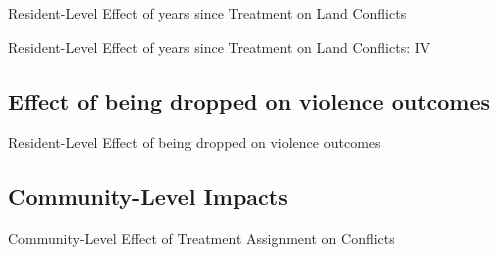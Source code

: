 \documentclass[10pt]{article}
\begin{document}
\begin{landscape}
\begin{table}[H]
\caption{Resident-Level Effect of years since Treatment on Land Conflicts}
\begin{center}
\begin{adjustbox}{max height = .6\textheight}

\end{adjustbox}
\end{center}
\end{table}

\begin{table}[H]
\caption{Resident-Level Effect of years since Treatment on Land Conflicts: IV}
\begin{center}
\begin{adjustbox}{max width = \textwidth}

\end{adjustbox}
\end{center}
\end{table}
\end{landscape}


\subsection{Effect of being dropped on violence outcomes}
\begin{table}[H]
\caption{Resident-Level Effect of being dropped on violence outcomes}
\begin{center}
\begin{adjustbox}{max width = \textwidth}

\end{adjustbox}
\end{center}
\end{table}

\clearpage

\subsection{Community-Level Impacts}

\begin{table}[H]
\caption{Community-Level Effect of Treatment Assignment on Conflicts}
\begin{center}
\begin{adjustbox}{max width = \textwidth}

\end{adjustbox}
\end{center}
\end{table}
\end{document}
